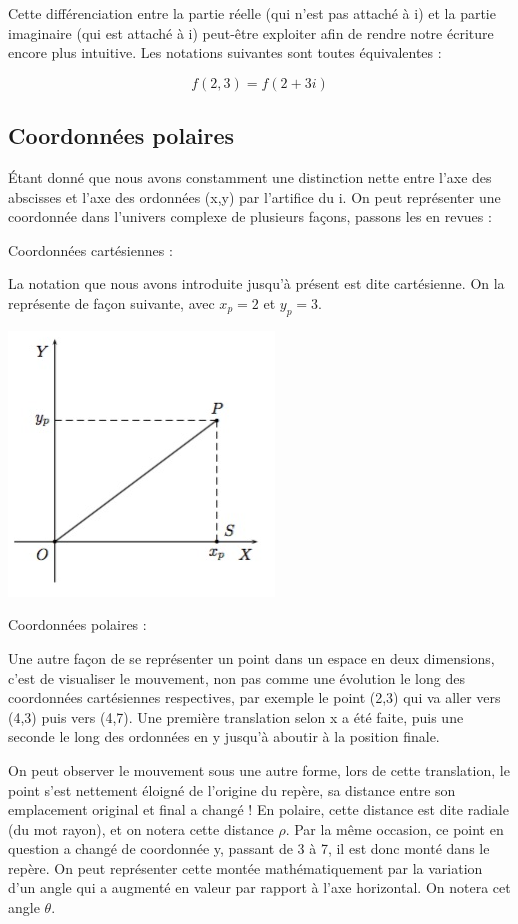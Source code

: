 Cette différenciation entre la partie réelle (qui n'est pas attaché à i) et la partie imaginaire (qui est attaché à i) peut-être exploiter afin de rendre notre écriture encore plus intuitive. Les notations suivantes sont toutes équivalentes : 

$$f(2,3) = f(2 + 3i)$$

\subsection{Coordonnées polaires}


Étant donné que nous avons constamment une distinction nette entre l'axe des abscisses et l'axe des ordonnées (x,y) par l'artifice du i. On peut représenter une coordonnée dans l'univers complexe de plusieurs façons, passons les en revues : 

Coordonnées cartésiennes : 

La notation que nous avons introduite jusqu'à présent est dite cartésienne. On la représente de façon suivante, avec $x_p = 2$ et $y_p = 3$. 

\includegraphics[scale=.5]{assets/imgs/complexe.png}

Coordonnées polaires :

Une autre façon de se représenter un point dans un espace en deux dimensions, c'est de visualiser le mouvement, non pas comme une évolution le long des coordonnées cartésiennes respectives, par exemple le point (2,3) qui va aller vers (4,3) puis vers (4,7). Une première translation selon x a été faite, puis une seconde le long des ordonnées en y jusqu'à aboutir à la position finale.

On peut observer le mouvement sous une autre forme, lors de cette translation, le point s'est nettement éloigné de l'origine du repère, sa distance entre son emplacement original et final a changé ! En polaire, cette distance est dite radiale (du mot rayon), et on notera cette distance $\rho$. Par la même occasion, ce point en question a changé de coordonnée y, passant de 3 à 7, il est donc monté dans le repère. On peut représenter cette montée mathématiquement par la variation d'un angle qui a augmenté en valeur par rapport à l'axe horizontal. On notera cet angle $\theta$.

